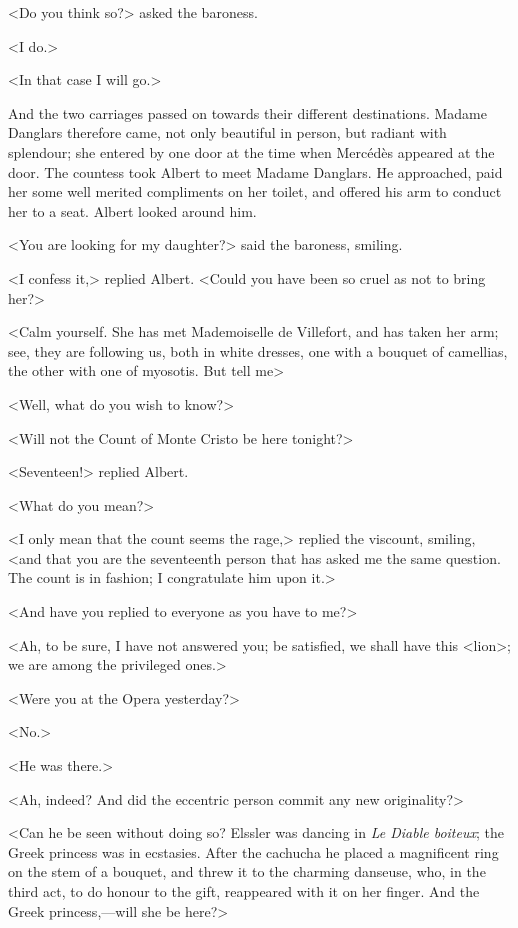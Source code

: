  <Do you think so?> asked the baroness. 

 <I do.> 

 <In that case I will go.> 

 And the two carriages passed on towards their different destinations. Madame Danglars therefore came, not only beautiful in person, but radiant with splendour; she entered by one door at the time when Mercédès appeared at the door. The countess took Albert to meet Madame Danglars. He approached, paid her some well merited compliments on her toilet, and offered his arm to conduct her to a seat. Albert looked around him. 

 <You are looking for my daughter?> said the baroness, smiling. 

 <I confess it,> replied Albert. <Could you have been so cruel as not to bring her?> 

 <Calm yourself. She has met Mademoiselle de Villefort, and has taken her arm; see, they are following us, both in white dresses, one with a bouquet of camellias, the other with one of myosotis. But tell me\longdash> 

 <Well, what do you wish to know?> 

 <Will not the Count of Monte Cristo be here tonight?> 

 <Seventeen!> replied Albert. 

 <What do you mean?> 

 <I only mean that the count seems the rage,> replied the viscount, smiling, <and that you are the seventeenth person that has asked me the same question. The count is in fashion; I congratulate him upon it.> 

 <And have you replied to everyone as you have to me?> 

 <Ah, to be sure, I have not answered you; be satisfied, we shall have this <lion>; we are among the privileged ones.> 

 <Were you at the Opera yesterday?> 

 <No.> 

 <He was there.> 

 <Ah, indeed? And did the eccentric person commit any new originality?> 

 <Can he be seen without doing so? Elssler was dancing in \textit{Le Diable boiteux}; the Greek princess was in ecstasies. After the cachucha he placed a magnificent ring on the stem of a bouquet, and threw it to the charming danseuse, who, in the third act, to do honour to the gift, reappeared with it on her finger. And the Greek princess,—will she be here?> 

